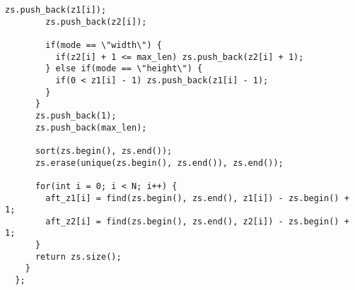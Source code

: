 \documentclass{jsarticle}
\begin{document}
\begin{lstlisting}[caption=CoordinateCompression]
        zs.push_back(z1[i]);
        zs.push_back(z2[i]);
  
        if(mode == \"width\") {
          if(z2[i] + 1 <= max_len) zs.push_back(z2[i] + 1);
        } else if(mode == \"height\") {
          if(0 < z1[i] - 1) zs.push_back(z1[i] - 1);
        }
      }
      zs.push_back(1);
      zs.push_back(max_len);
  
      sort(zs.begin(), zs.end());
      zs.erase(unique(zs.begin(), zs.end()), zs.end());
  
      for(int i = 0; i < N; i++) {
        aft_z1[i] = find(zs.begin(), zs.end(), z1[i]) - zs.begin() + 1;
        aft_z2[i] = find(zs.begin(), zs.end(), z2[i]) - zs.begin() + 1;
      }
      return zs.size();
    }
  };
  

\end{lstlisting}

\color{white}
\end{document}
